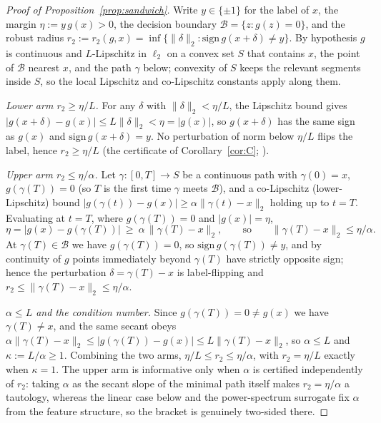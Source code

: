 \documentclass{article}
\theoremstyle{definition}
\begin{document}
\begin{proof}[Proof of Proposition~\ref{prop:sandwich}]
Write $y\in\{\pm1\}$ for the label of $x$, the margin $\eta:=y\,g(x)>0$, the decision
boundary $\mathcal B=\{z:g(z)=0\}$, and the robust radius
$r_2:=r_2(g,x)=\inf\{\|\delta\|_2:\mathrm{sign}\,g(x+\delta)\neq y\}$.
By hypothesis $g$ is continuous and $L$-Lipschitz in $\ell_2$ on a convex set $S$ that
contains $x$, the point of $\mathcal B$ nearest $x$, and the path $\gamma$ below;
convexity of $S$ keeps the relevant segments inside $S$, so the local Lipschitz and
co-Lipschitz constants apply along them.

\emph{Lower arm $r_2\ge\eta/L$.}
For any $\delta$ with $\|\delta\|_2<\eta/L$, the Lipschitz bound gives
$|g(x+\delta)-g(x)|\le L\|\delta\|_2<\eta=|g(x)|$, so $g(x+\delta)$ has the same sign as
$g(x)$ and $\mathrm{sign}\,g(x+\delta)=y$. No perturbation of norm below $\eta/L$ flips the
label, hence $r_2\ge\eta/L$ (the certificate of Corollary~\ref{cor:C};
\citealp{hein2017formal,tsuzuku2018lipschitz}).

\emph{Upper arm $r_2\le\eta/\alpha$.}
Let $\gamma:[0,T]\to S$ be a continuous path with $\gamma(0)=x$, $g(\gamma(T))=0$ (so $T$ is
the first time $\gamma$ meets $\mathcal B$), and a co-Lipschitz (lower-Lipschitz) bound
$|g(\gamma(t))-g(x)|\ge\alpha\|\gamma(t)-x\|_2$ holding up to $t=T$. Evaluating at $t=T$,
where $g(\gamma(T))=0$ and $|g(x)|=\eta$,
\[
\eta=|g(x)-g(\gamma(T))|\ \ge\ \alpha\,\|\gamma(T)-x\|_2,
\qquad\text{so}\qquad \|\gamma(T)-x\|_2\le \eta/\alpha .
\]
At $\gamma(T)\in\mathcal B$ we have $g(\gamma(T))=0$, so $\mathrm{sign}\,g(\gamma(T))\neq y$,
and by continuity of $g$ points immediately beyond $\gamma(T)$ have strictly opposite sign;
hence the perturbation $\delta=\gamma(T)-x$ is label-flipping and
$r_2\le\|\gamma(T)-x\|_2\le\eta/\alpha$.

\emph{$\alpha\le L$ and the condition number.}
Since $g(\gamma(T))=0\neq g(x)$ we have $\gamma(T)\neq x$, and the same secant obeys
$\alpha\|\gamma(T)-x\|_2\le|g(\gamma(T))-g(x)|\le L\|\gamma(T)-x\|_2$, so $\alpha\le L$ and
$\kappa:=L/\alpha\ge1$. Combining the two arms, $\eta/L\le r_2\le\eta/\alpha$, with
$r_2=\eta/L$ exactly when $\kappa=1$. The upper arm is informative only when $\alpha$ is
certified independently of $r_2$: taking $\alpha$ as the secant slope of the minimal path
itself makes $r_2=\eta/\alpha$ a tautology, whereas the linear case below and the
power-spectrum surrogate fix $\alpha$ from the feature structure, so the bracket is genuinely
two-sided there.


\end{proof}
\end{document}
